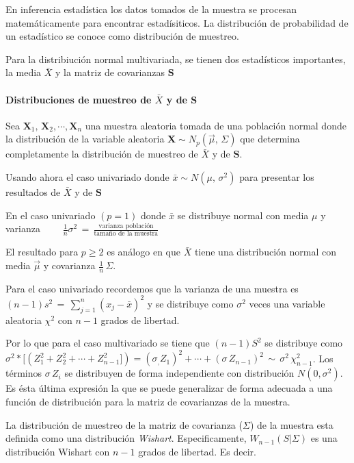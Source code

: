 \documentclass[english]{report}
\begin{document}
En inferencia estadística los datos tomados de la muestra se procesan matemáticamente para encontrar estadísiticos. La distribución de probabilidad de un estadístico se conoce como distribución de muestreo. 

Para la distribiución normal multivariada, se tienen dos estadísticos importantes, la media $\bar{X}$ y la matriz de covarianzas $\textbf{S}$ 


\paragraph{Distribuciones de muestreo de $\bar{X}$ y de $\textbf{S}$}

Sea $\textbf{X}_1,\,\textbf{X}_2,\cdots,\textbf{X}_n$ una muestra aleatoria tomada de una población normal donde la distribución de la variable aleatoria $\textbf{X} \sim N_p(\vec{\mu},\,\Sigma)$ que determina completamente la distribución de muestreo de $\bar{X}$ y de $\textbf{S}$.

Usando ahora el caso univariado donde $\bar{x} \sim N(\mu,\,\sigma^2)$ para presentar los resultados de $\bar{X}$ y de $\textbf{S}$

\vspace{5pt}

En el caso univariado $(p=1)$ donde $\bar{x}$ se distribuye normal con media $\mu$ y varianza
$\qquad \frac{1}{n}\sigma^2\,=\,\frac{\text{varianza población}}{\text{tamaño de la muestra}}$  

\vspace{5pt}
  
El resultado para $p \geq 2$ es análogo en que $\bar{X}$ tiene una distribución normal con media $\vec{\mu}$ y covarianza $\frac{1}{n}\,\Sigma$.

Para el caso univariado recordemos que la varianza de una muestra es $(n-1)s^2\,=\,\sum_{j=1}^n(x_j-\bar{x})^2$ y se distribuye como $\sigma^2$ veces una variable aleatoria $\chi^2$ con $n-1$ grados de libertad.

Por lo que para el caso multivariado se tiene que $(n-1)S^2$ se distribuye como $\sigma^2*[(Z^2_1+Z^2_2+\cdots+Z^2_{n-1}])=(\sigma_,Z_1)^2+\cdots+(\sigma\,Z_{n-1})^2\,\sim\,\sigma^2\,\chi_{n-1}^2$. Los términos $\sigma\,Z_i$ se distribuyen de forma independiente con distribución $N(0,\sigma^2)$. Es ésta última expresión la que se puede generalizar de forma adecuada a una función de distribución para la matriz de covarianzas de la muestra.

La distribución de muestreo de la matriz de covarianza ($\Sigma$) de la muestra esta definida como una distribución \emph{Wishart}. Especificamente, $W_{n-1}(S|\Sigma)$ es una distribución Wishart con $n-1$ grados de libertad. Es decir. 
\end{document}
